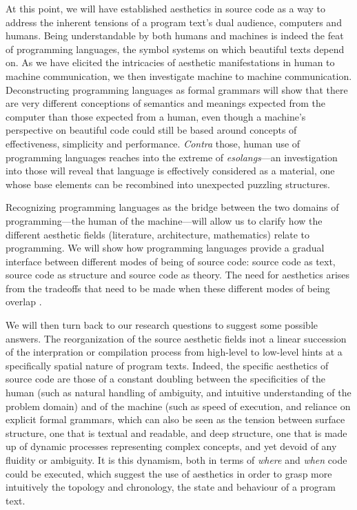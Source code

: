 At this point, we will have established aesthetics in source code as a way to address the inherent tensions of a program text's dual audience, computers and humans. Being understandable by both humans and machines is indeed the feat of programming languages, the symbol systems on which beautiful texts depend on. As we have elicited the intricacies of aesthetic manifestations in human to machine communication, we then investigate machine to machine communication. Deconstructing programming languages as formal grammars will show that there are very different conceptions of semantics and meanings expected from the computer than those expected from a human, even though a machine's perspective on beautiful code could still be based around concepts of effectiveness, simplicity and performance. \emph{Contra} those, human use of programming languages reaches into the extreme of \emph{esolangs}—an investigation into those will reveal that language is effectively considered as a material, one whose base elements can be recombined into unexpected puzzling structures.

Recognizing programming languages as the bridge between the two domains of programming—the human of the machine—will allow us to clarify how the different aesthetic fields (literature, architecture, mathematics) relate to programming. We will show how programming languages provide a gradual interface between different modes of being of source code: source code as text, source code as structure and source code as theory. The need for aesthetics arises from the tradeoffs that need to be made when these different modes of being overlap \citep{simondon_mode_1958}.

We will then turn back to our research questions to suggest some possible answers. The reorganization of the source aesthetic fields inot a linear succession of the interpration or compilation process from high-level to low-level hints at a specifically spatial nature of program texts. Indeed, the specific aesthetics of source code are those of a constant doubling between the specificities of the human (such as natural handling of ambiguity, and intuitive understanding of the problem domain) and of the machine (such as speed of execution, and reliance on explicit formal grammars, which can also be seen as the tension between surface structure, one that is textual and readable, and deep structure, one that is made up of dynamic processes representing complex concepts, and yet devoid of any fluidity or ambiguity. It is this dynamism, both in terms of \emph{where} and \emph{when} code could be executed, which suggest the use of aesthetics in order to grasp more intuitively the topology and chronology, the state and behaviour of a program text.

